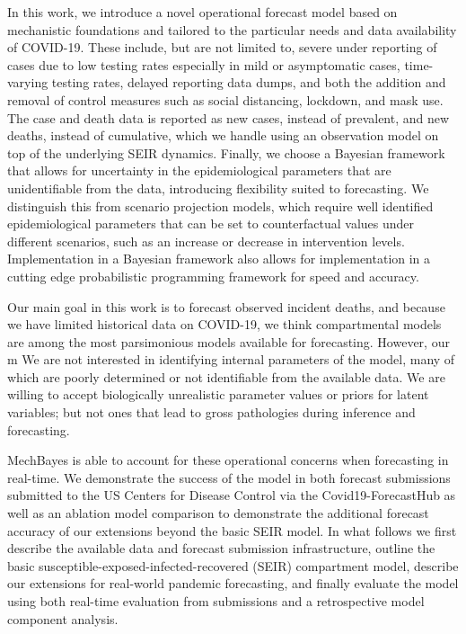 \documentclass[11pt]{amsart}
\begin{document}
In this work, we introduce a novel operational forecast model based on mechanistic foundations and tailored to the particular needs and data availability of COVID-19. These include, but are not limited to, severe under reporting of cases due to low testing rates especially in mild or asymptomatic cases, time-varying testing rates, delayed reporting data dumps, and both the addition and removal of control measures such as social distancing, lockdown, and mask use. The case and death data is reported as new cases, instead of prevalent, and new deaths, instead of cumulative, which we handle using an observation model on top of the underlying SEIR dynamics. Finally, we choose a Bayesian framework that allows for uncertainty in the epidemiological parameters that are unidentifiable from the data, introducing flexibility suited to forecasting. We distinguish this from scenario projection models, which require well identified epidemiological parameters that can be set to counterfactual values under different scenarios, such as an increase or decrease in intervention levels. Implementation in a Bayesian framework also allows for implementation in a cutting edge probabilistic programming framework for speed and accuracy. 

Our main goal in this work is to forecast observed incident deaths, and because we have limited historical data on COVID-19, we think compartmental models are among the most parsimonious models available for forecasting. However, our m We are not interested in identifying internal parameters of the model, many of which are poorly determined or not identifiable from the available data. We are willing to accept biologically unrealistic parameter values or priors for latent variables; but not ones that lead to gross pathologies during inference and forecasting.


 MechBayes is able to account for these operational concerns when forecasting in real-time. We demonstrate the success of the model in both forecast submissions submitted to the US Centers for Disease Control via the Covid19-ForecastHub as well as an ablation model comparison to demonstrate the additional forecast accuracy of our extensions beyond the basic SEIR model. In what follows we first describe the available data and forecast submission infrastructure, outline the basic susceptible-exposed-infected-recovered (SEIR) compartment model, describe our extensions for real-world pandemic forecasting, and finally evaluate the model using both real-time evaluation from submissions and a retrospective model component analysis. 
\end{document}
